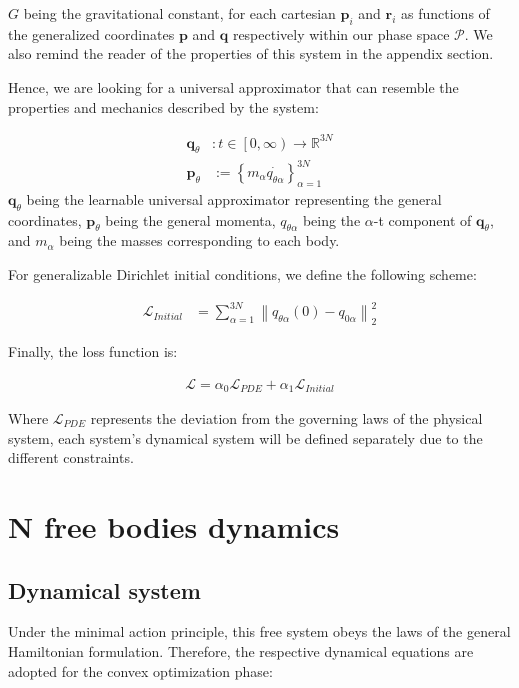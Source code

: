 \documentclass[draft]{agujournal2019}
\newcommand{\norm}[1]{\left\lVert#1\right\rVert}
\begin{document}
$G$ being the gravitational constant, for each cartesian $\mathbf{p}_i$ and $\mathbf{r}_i$ as functions of the generalized coordinates $\mathbf{p}$ and $\mathbf{q}$ respectively within our phase space $\mathcal{P}$. We also remind the reader of the properties of this system in the appendix section.

Hence, we are looking for a universal approximator that can resemble the properties and mechanics described by the system:

\begin{align}
    \mathbf{q}_\theta &\colon t \in \left[0, \infty\right)\to \mathbb{R}^{3N} \\
    \mathbf{p}_\theta &:= \left\{ m_\alpha \dot{q_{\theta\alpha}} \right\}_{\alpha = 1}^{3N}
\end{align}
$\mathbf{q}_\theta$ being the learnable universal approximator representing the general coordinates, $\mathbf{p}_\theta$ being the general momenta, $q_{\theta\alpha}$ being the $\alpha$-t component of $\mathbf{q}_\theta$, and $m_{\alpha}$ being the masses corresponding to each body.

For generalizable Dirichlet initial conditions, we define the following scheme:

\begin{align}
    \mathcal{L}_{Initial} &= \sum_{\alpha = 1}^{3N} \norm{q_{\theta\alpha}(0) - q_{0\alpha}}^2_2
\end{align}

Finally, the loss function is:

\begin{align}
    \mathcal{L} = \alpha_0 \mathcal{L}_{PDE} + \alpha_1 \mathcal{L}_{Initial}
\end{align}

Where $\mathcal{L}_{PDE}$ represents the deviation from the governing laws of the physical system, each system's dynamical system will be defined separately due to the different constraints.

\section{N free bodies dynamics}
\subsection{Dynamical system}
Under the minimal action principle, this free system obeys the laws of the general Hamiltonian formulation. Therefore, the respective dynamical equations are adopted for the convex optimization phase:
\end{document}
